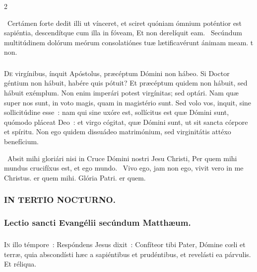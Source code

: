 \documentclass[9pt,twoside]{extarticle}
\begin{document}
\begin{multicols}{2}
{\begin{tightlist}{}
\item {}~Certámen forte dedit illi ut vínceret, et sciret quóniam ómnium poténtior est sapiéntia, descendítque cum illa in fóveam, \textred{*} Et non derelíquit eam. ~Secúndum multitúdinem dolórum meórum consolatiónes tuæ lætificavérunt ánimam meam. t non.
\end{tightlist}

\subsubsection*{\center {}}
\lettrine{D}e virgínibus, ínquit Apóstolus, præcéptum Dómini non hábeo. Si Doctor géntium non hábuit, habére quis pótuit? Et præcéptum quidem non hábuit, sed hábuit exémplum. Non enim imperári potest virgínitas; sed optári. Nam quæ super nos sunt, in voto magis, quam in magistério sunt. Sed volo vos, inquit, sine sollicitúdine esse~: nam qui sine uxóre est, sollícitus est quæ Dómini sunt, quómodo pláceat Deo~: et virgo cógitat, quæ Dómini sunt, ut sit sancta córpore et spíritu. Non ego quidem dissuádeo matrimónium, sed virginitátis attéxo benefícium.

\begin{tightlist}{}
\item {}~Absit mihi gloriári nisi in Cruce Dómini nostri Jesu Christi, \textred{*} Per quem mihi mundus crucifíxus est, et ego mundo. ~Vivo ego, jam non ego, vivit vero in me Christus. er quem mihi. Glória Patri. er quem.
\end{tightlist}

\subsubsection*{\center \textsc{IN TERTIO NOCTURNO.}}
\subsubsection*{\center Lectio sancti Evangélii secúndum Matthæum.}
\subsubsection*{\center {}}
\lettrine{I}n illo témpore~: Respóndens Jesus dixit~: Confíteor tibi Pater, Dómine cœli et terræ, quia abscondísti hæc a sapiéntibus et prudéntibus, et revelásti ea párvulis. Et réliqua.

}
\end{multicols}
\end{document}
